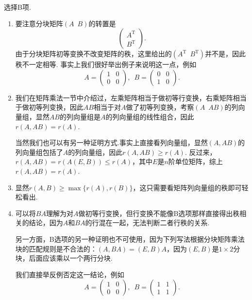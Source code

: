 \begin{solution}
    选择B项.
    \begin{enumerate}[label=\Alph*.]
        \item 要注意分块矩阵$(A\enspace B)$的转置是
            \[\begin{pmatrix}
                    A^\mathrm{T} \\ B^\mathrm{T}
                \end{pmatrix}.\]
            由于分块矩阵初等变换不改变矩阵的秩，这里给出的$(A^\mathrm{T}\enspace B^\mathrm{T})$并不是，因此秩不一定相等. 事实上我们很好举出例子来说明这一点，例如
            \[A=\begin{pmatrix}
                1 & 0 \\ 0 & 0
            \end{pmatrix},\enspace B=\begin{pmatrix}
                0 & 0 \\ 1 & 0
            \end{pmatrix}.\]

        \item 我们在矩阵乘法一节中介绍过，左乘矩阵相当于做初等行变换，右乘矩阵相当于做初等列变换，因此$AB$相当于对$A$做了初等列变换，考察$(A\enspace AB)$的列向量组，显然$AB$的列向量组是$A$的列向量组的线性组合，因此$r(A,AB)=r(A)$.

        当然我们也可以有另一种证明方式.事实上直接看列向量组，显然$(A,AB)$的列向量组包括了$A$的列向量组，因此$r(A,AB)\geqslant r(A)$. 反过来，$r(A,AB)=r(A(E,B))\leqslant r(A)$，其中$E$是$n$阶单位矩阵，综上$r(A,AB)=r(A)$.

        \item 显然$r(A,B)\geqslant \max\{r(A), r(B)\}$，这只需要看矩阵列向量组的秩即可轻松看出.

        \item 可以将$BA$理解为对$A$做初等行变换，但行变换不能像B选项那样直接得出秩相关的结论，因为$A$和$BA$的行混在一起，无法判断二者行秩的关系.

        另一方面，B选项的另一种证明也不可使用，因为下列写法根据分块矩阵乘法块的匹配规则是不合法的：$(A,BA)=(E,B)A$，因为$(E,B)$是$1\times 2$分块，后面应该乘以一个两行分块.

        我们直接举反例否定这一结论，例如
        \[A=\begin{pmatrix}
            1 & 0 \\ 0 & 0
        \end{pmatrix},\enspace B=\begin{pmatrix}
            1 & 1 \\ 1 & 1
        \end{pmatrix}.\]
    \end{enumerate}
\end{solution}

